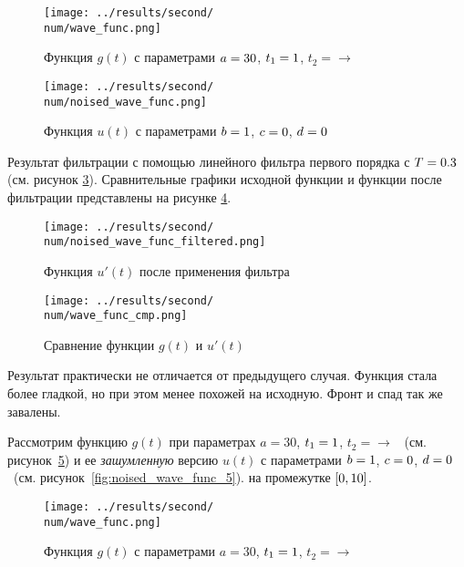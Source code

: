 \begin{figure}[ht!]
    \centering
    \texttt{[image: ../results/second/\\num/wave\_func.png]}
    \caption{Функция $g(t)$ с параметрами $a = \a$, $t_1 = 1$, $t_2 = \to$}
    \label{fig:wave_func_\num}
\end{figure}

\begin{figure}[ht!]
    \centering
    \texttt{[image: ../results/second/\\num/noised\_wave\_func.png]}
    \caption{Функция $u(t)$ с параметрами $b = 1$, $c = 0$, $d = 0$}
    \label{fig:noised_wave_func_\num}
\end{figure}

Результат фильтрации с помощью линейного фильтра первого порядка с $T = 0.3$ (см. рисунок \ref{fig:noised_wave_func_filtered_\num}).
Сравнительные графики исходной функции и функции после фильтрации представлены на рисунке \ref{fig:wave_func_cmp_\num}.

\begin{figure}[ht!]
    \centering
    \texttt{[image: ../results/second/\\num/noised\_wave\_func\_filtered.png]}
    \caption{Функция $u'(t)$ после применения фильтра}
    \label{fig:noised_wave_func_filtered_\num}
\end{figure}

\begin{figure}[ht!]
    \centering
    \texttt{[image: ../results/second/\\num/wave\_func\_cmp.png]}
    \caption{Сравнение функции $g(t)$ и $u'(t)$}
    \label{fig:wave_func_cmp_\num}
\end{figure}

Результат практически не отличается от предыдущего случая. Функция стала более гладкой, но при этом
менее похожей на исходную. Фронт и спад так же завалены. 

\def\num{5}
\def\a{30}
Рассмотрим функцию $g(t)$ при параметрах $a=\a$, $t_1 = 1$, $t_2 = \to$ ~(см. рисунок~\ref{fig:wave_func_\num}) 
и ее \textit{зашумленную} версию $u(t)$ с параметрами $b = 1$, $c = 0$, $d = 0$ ~(см. рисунок~\ref{fig:noised_wave_func_\num}).
на промежутке $[0,10]$. 

\begin{figure}[ht!]
    \centering
    \texttt{[image: ../results/second/\\num/wave\_func.png]}
    \caption{Функция $g(t)$ с параметрами $a = \a$, $t_1 = 1$, $t_2 = \to$}
    \label{fig:wave_func_\num}
\end{figure}

